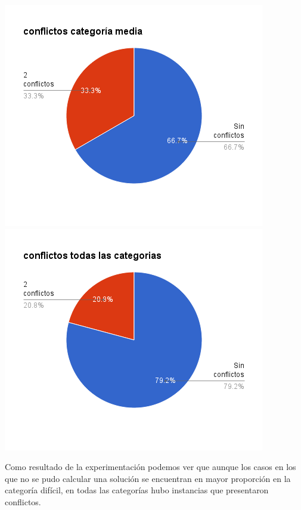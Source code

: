 \documentclass[a4paper,spanish]{article}
\begin{document}
\begin{minipage}{0.50\textwidth}
\includegraphics[width=\textwidth]{./graficos/conflictosMedia.png}
\includegraphics[width=\textwidth]{./graficos/conflictosTodas.png}
\end{minipage}

Como resultado de la experimentación podemos ver que aunque los casos en los que no se pudo calcular una solución se encuentran en mayor proporción en la categoría difícil, en todas las categorías hubo instancias que presentaron conflictos.
\end{document}
